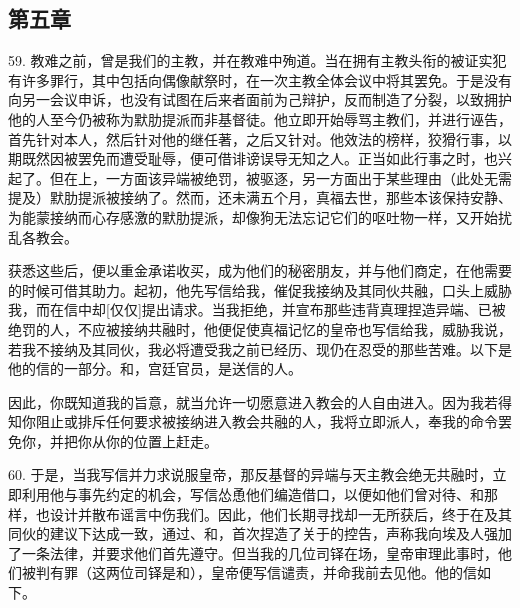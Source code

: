 
\subsection{第五章 }

59. 教难之前，曾是我们的主教，并在教难中殉道。当在拥有主教头衔的被证实犯有许多罪行，其中包括向偶像献祭时，在一次主教全体会议中将其罢免。于是没有向另一会议申诉，也没有试图在后来者面前为己辩护，反而制造了分裂，以致拥护他的人至今仍被称为默肋提派而非基督徒。他立即开始辱骂主教们，并进行诬告，首先针对本人，然后针对他的继任著，之后又针对。他效法的榜样，狡猾行事，以期既然因被罢免而遭受耻辱，便可借诽谤误导无知之人。正当如此行事之时，也兴起了。但在上，一方面该异端被绝罚，被驱逐，另一方面出于某些理由（此处无需提及）默肋提派被接纳了。然而，还未满五个月，真福去世，那些本该保持安静、为能蒙接纳而心存感激的默肋提派，却像狗无法忘记它们的呕吐物一样，又开始扰乱各教会。\par

获悉这些后，便以重金承诺收买，成为他们的秘密朋友，并与他们商定，在他需要的时候可借其助力。起初，他先写信给我，催促我接纳及其同伙共融，口头上威胁我，而在信中却[仅仅]提出请求。当我拒绝，并宣布那些违背真理捏造异端、已被绝罚的人，不应被接纳共融时，他便促使真福记忆的皇帝也写信给我，威胁我说，若我不接纳及其同伙，我必将遭受我之前已经历、现仍在忍受的那些苦难。以下是他的信的一部分。和，宫廷官员，是送信的人。\par

\par

因此，你既知道我的旨意，就当允许一切愿意进入教会的人自由进入。因为我若得知你阻止或排斥任何要求被接纳进入教会共融的人，我将立即派人，奉我的命令罢免你，并把你从你的位置上赶走。\par

60. 于是，当我写信并力求说服皇帝，那反基督的异端与天主教会绝无共融时，立即利用他与事先约定的机会，写信怂恿他们编造借口，以便如他们曾对待、和那样，也设计并散布谣言中伤我们。因此，他们长期寻找却一无所获后，终于在及其同伙的建议下达成一致，通过、和，首次捏造了关于的控告，声称我向埃及人强加了一条法律，并要求他们首先遵守。但当我的几位司铎在场，皇帝审理此事时，他们被判有罪（这两位司铎是和），皇帝便写信谴责，并命我前去见他。他的信如下。\par

